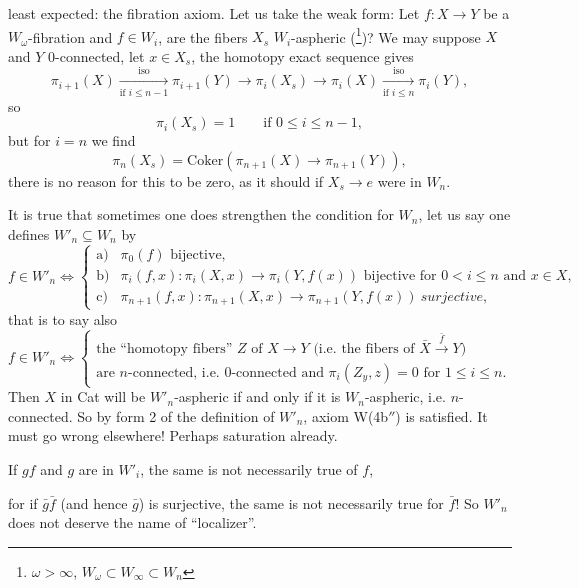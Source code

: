 \documentclass[11pt]{article}
\newcommand{\printedpage}[1]{\marginpar{\footnotesize p.~#1}}
\newcommand{\msp}[1]{\marginpar{\footnotesize [#1]}}
\begin{document}
\printedpage{14}
least expected: the fibration axiom. Let us take the weak form: Let $f : X \longrightarrow Y$ be a $W_\omega$-fibration and $f \in W_i$, are the fibers $X_s$ $W_i$-aspheric (\footnote[37]{$\omega > \infty$, $W_\omega \subset W_\infty \subset W_n$})? We may suppose $X$ and $Y$ 0-connected, let $x \in X_s$, the homotopy exact sequence gives
\[
\pi_{i+1}(X) \xrightarrow[\text{if } i \leq n-1]{\text{iso}} \pi_{i+1}(Y) \longrightarrow \pi_i(X_s) \longrightarrow \pi_i(X) \xrightarrow[\text{if } i \leq n]{\text{iso}} \pi_i(Y),
\]
so
\[
\pi_i(X_s) = 1 \qquad \text{if } 0 \leq i \leq n-1,
\]
but for $i = n$ we find\msp{page 17}
\[
\pi_n(X_s) = \mathrm{Coker}\left(\pi_{n+1}(X) \longrightarrow \pi_{n+1}(Y)\right),
\]
there is no reason for this to be zero, as it should if $X_s \longrightarrow e$ were in $W_n$.

It is true that sometimes one does strengthen the condition for $W_n$, let us say one defines $W'_n \subseteq W_n$ by
\[
f \in W'_n \iff \left\{
\begin{array}{ll}
\text{a)} & \pi_0(f) \text{ bijective,} \\[1ex]
\text{b)} & \pi_i(f,x) : \pi_i(X,x) \longrightarrow \pi_i(Y,f(x)) \text{ bijective for } 0 < i \leq n \text{ and } x \in X, \\[1ex]
\text{c)} & \pi_{n+1}(f,x) : \pi_{n+1}(X,x) \longrightarrow \pi_{n+1}(Y,f(x)) \ \textit{surjective,}
\end{array}
\right.
\]
that is to say also
\[
f \in W'_n \iff \left\{
\begin{array}{l}
\text{the ``homotopy fibers'' } Z \text{ of } X \longrightarrow Y \text{ (i.e. the fibers of } \bar{X} \xrightarrow{\bar{f}} Y\text{)} \\
\text{are } n\text{-connected, i.e. 0-connected and } \pi_i(Z_y,z) = 0 \text{ for } 1 \leq i \leq n.
\end{array}
\right.
\]
Then $X$ in Cat will be $W'_n$-aspheric if and only if it is $W_n$-aspheric, i.e. $n$-connected. So by form 2 of the definition of $W'_n$, axiom W(4b$''$) is satisfied. It must go wrong elsewhere! Perhaps saturation already.

\hspace*{3em}If $gf$ and $g$ are in $W'_i$, the same is not necessarily true of $f$,

for if $\bar{g}\bar{f}$ (and hence $\bar{g}$) is surjective, the same is not necessarily true for $\bar{f}$! So $W'_n$ does not deserve the name of ``localizer''. %
\end{document}
